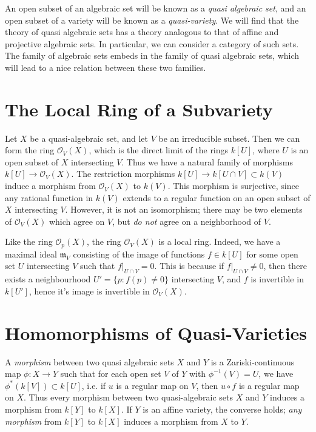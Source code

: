 An open subset of an algebraic set will be known as a \emph{quasi algebraic set}, and an open subset of a variety will be known as a \emph{quasi-variety}. We will find that the theory of quasi algebraic sets has a theory analogous to that of affine and projective algebraic sets. In particular, we can consider a category of such sets. The family of algebraic sets embeds in the family of quasi algebraic sets, which will lead to a nice relation between these two families.

\section{The Local Ring of a Subvariety}

Let $X$ be a quasi-algebraic set, and let $V$ be an irreducible subset. Then we can form the ring $\mathcal{O}_V(X)$, which is the direct limit of the rings $k[U]$, where $U$ is an open subset of $X$ intersecting $V$. Thus we have a natural family of morphisms $k[U] \to \mathcal{O}_V(X)$. The restriction morphisms $k[U] \to k[U \cap V] \subset k(V)$ induce a morphism from $\mathcal{O}_V(X)$ to $k(V)$. This morphism is surjective, since any rational function in $k(V)$ extends to a regular function on an open subset of $X$ intersecting $V$. However, it is not an isomorphism; there may be two elements of $\mathcal{O}_V(X)$ which agree on $V$, but \emph{do not} agree on a neighborhood of $V$.

Like the ring $\mathcal{O}_p(X)$, the ring $\mathcal{O}_V(X)$ is a local ring. Indeed, we have a maximal ideal $\mathfrak{m}_V$ consisting of the image of functions $f \in k[U]$ for some open set $U$ intersecting $V$ such that $f|_{U \cap V} = 0$. This is because if $f|_{U \cap V} \neq 0$, then there exists a neighbourhood $U' = \{ p: f(p) \neq 0 \}$ intersecting $V$, and $f$ is invertible in $k[U']$, hence it's image is invertible in $\mathcal{O}_V(X)$.

\section{Homomorphisms of Quasi-Varieties}

A \emph{morphism} between two quasi algebraic sets $X$ and $Y$ is a Zariski-continuous map $\phi: X \to Y$ such that for each open set $V$ of $Y$ with $\phi^{-1}(V) = U$, we have $\phi^*(k[V]) \subset k[U]$, i.e. if $u$ is a regular map on $V$, then $u \circ f$ is a regular map on $X$. Thus every morphism between two quasi-algebraic sets $X$ and $Y$ induces a morphism from $k[Y]$ to $k[X]$. If $Y$ is an affine variety, the converse holds; \emph{any morphism} from $k[Y]$ to $k[X]$ induces a morphism from $X$ to $Y$.

